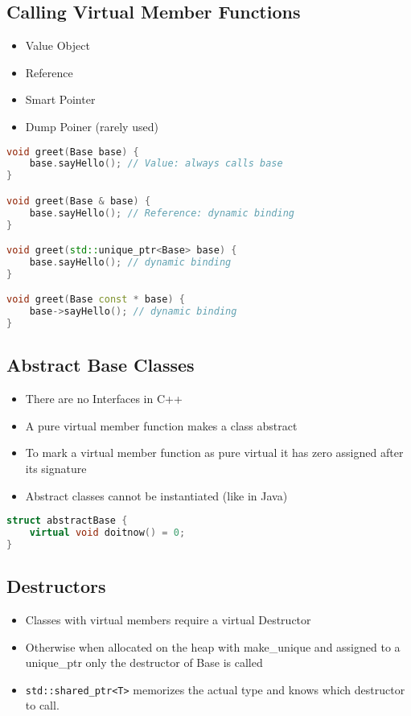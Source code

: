 \subsection{Calling Virtual Member Functions}
\begin{itemize}
  \itemsep -0.5em 
  \item Value Object
  \item	Reference
  \item Smart Pointer
  \item Dump Poiner (rarely used)
\end{itemize}

\begin{lstlisting}[language=C++]
void greet(Base base) {
	base.sayHello(); // Value: always calls base
}

void greet(Base & base) {
	base.sayHello(); // Reference: dynamic binding
}

void greet(std::unique_ptr<Base> base) {
	base.sayHello(); // dynamic binding
}

void greet(Base const * base) {
	base->sayHello(); // dynamic binding
}
\end{lstlisting}

\subsection{Abstract Base Classes}
\begin{itemize}
  \itemsep -0.5em 
  \item There are no Interfaces in C++
  \item A pure virtual member function makes a class abstract
  \item To mark a virtual member function as pure virtual it has zero assigned after its signature
  \item Abstract classes cannot be instantiated (like in Java)
\end{itemize}

\begin{lstlisting}[language=C++]
struct abstractBase {
	virtual void doitnow() = 0;
}
\end{lstlisting}

\subsection{Destructors}
\begin{itemize}
  \itemsep -0.5em 
  \item Classes with virtual members require a virtual Destructor
  \item Otherwise when allocated on the heap with make\_unique and assigned to a unique\_ptr only the destructor of Base is called
  \item \lstinline|std::shared_ptr<T>| memorizes the actual type and knows which destructor to call.
\end{itemize}

